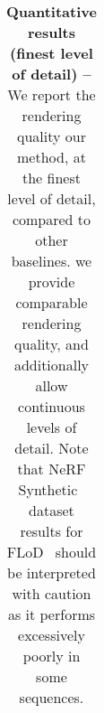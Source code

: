 \begin{table}[!t]
{\begin{tabular}{lccccccccc}
    \end{tabular}
  }
  \caption{
    \textbf{Quantitative results (finest level of detail) --}
    We report the rendering quality our method, at the finest level of detail,
    compared to other baselines.
    we provide comparable rendering quality, and additionally allow continuous levels of detail.
    Note that NeRF Synthetic~\cite{mildenhall2020nerf} dataset results for
    FLoD~\cite{seo2024flod} should be interpreted with caution as it performs
    excessively poorly in some sequences.
  }
  \label{tab:clog-quantitative}
\end{table}
